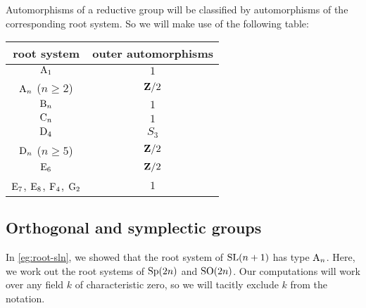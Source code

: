 Automorphisms of a reductive group will be classified by automorphisms of the 
corresponding root system. So we will make use of the following table:
\begin{center}
\begin{tabular}{c|c}
  root system                 & outer automorphisms \\ \hline
  $\mathrm{A}_1$                  & $1$ \\
  $\mathrm{A}_n$ ($n\geqslant 2$) & $\mathbf{Z}/2$  \\
  $\mathrm{B}_n$                  & $1$ \\
  $\mathrm{C}_n$                  & $1$ \\
  $\mathrm{D}_4$                  & $S_3$ \\
  $\mathrm{D}_n$ ($n\geqslant 5$) & $\mathbf{Z}/2$ \\
  $\mathrm{E}_6$                  & $\mathbf{Z}/2$ \\
  $\mathrm{E}_7$, $\mathrm{E}_8$, $\mathrm{F}_4$, $\mathrm{G}_2$ & $1$
\end{tabular}
\end{center}





\subsection{Orthogonal and symplectic groups}

In \autoref{eg:root-sln}, we showed that the root system of $\operatorname{SL}(n+1)$ has type 
$\mathrm{A}_n$. Here, we work out the root systems of $\operatorname{Sp}(2n)$ and $\operatorname{SO}(2n)$. Our 
computations will work over any field $k$ of characteristic zero, so we will 
tacitly exclude $k$ from the notation. 



